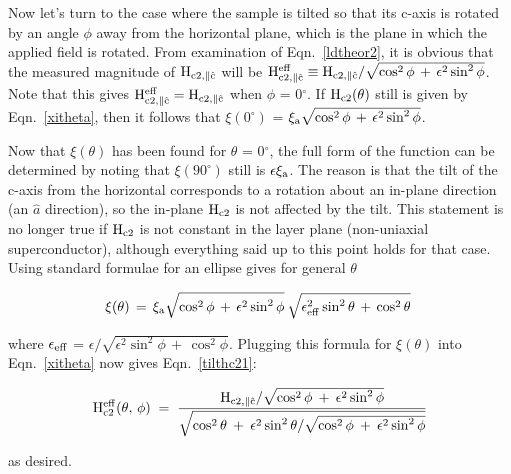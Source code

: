         Now let's turn to the case  where the sample is  tilted so that its
c-axis is rotated by an angle $\phi$ away  from the horizontal plane, which is
the plane in which the applied field is rotated.  From examination of
Eqn.~\ref{ldtheor2}, it is obvious that the measured magnitude of $\rm
H_{c2, \parallel \hat{c}}$ will be $\rm H_{c2, \parallel \hat{c}} ^{eff}
\equiv H_{c2,\parallel \hat{c}}/ \sqrt{\cos^2 \phi \, + \, \epsilon ^2
\sin^2 \phi}$.  Note that this gives $\rm H_{c2, \parallel \hat{c}}^{eff} =
H_{c2,   \parallel  \hat{c}}$ when     $\phi$  =   0$^{\circ}$.   If   $\rm
H_{c2}(\theta)$ still is given by Eqn.~\ref{xitheta}, then it  follows that
$\xi(0^{\circ})$ = $\rm \xi_a \sqrt{\cos^2 \phi \, + \, \epsilon^2 \sin^2
\phi}$.   

        Now that $\xi(\theta)$ has been  found  for $\theta$ = 0$^{\circ}$,
the   full form  of   the function   can  be   determined   by  noting that
$\xi(90^{\circ})$ still is  $\rm \epsilon  \xi_a$.  The reason is  that the
tilt of the c-axis from  the horizontal  corresponds to a rotation about an
in-plane direction (an $\hat{a}$  direction), so the  in-plane $\rm H_{c2}$
is not affected by   the  tilt. This statement is   no longer true  if $\rm
H_{c2}$ is not constant in  the layer plane  (non-uniaxial superconductor),
although  everything  said  up  to this   point holds for  that case. Using
standard formulae for an ellipse gives for general $\theta$

\[
\rm  \xi(\theta) \, = \,  \xi_a
\sqrt{\cos^2 \phi \, + \,   \epsilon^2 \sin^2  \phi} \:  \sqrt{\epsilon_{eff}^2 \sin^2\theta \, +  \,
\cos^2 \theta} \;   
\]

\noindent where $\rm \epsilon_{eff}$ = $\epsilon / \sqrt{\epsilon^2 \sin^2
\phi \, + \, \cos ^2 \phi}$.  Plugging this formula for $\xi(\theta)$ into
Eqn.~\ref{xitheta} now gives Eqn.~\ref{tilthc21}:

\begin{equation}
\label{tilthc21}
\rm H_{c2}^{eff}(\theta,\, \phi) \; = \; \frac{H_{c2, \parallel
\hat{c}}/\sqrt{\cos^2\phi \: + \: \epsilon^2\sin^2\phi}}{\sqrt{\cos^2\theta
\: + \: \epsilon^2\sin^2\theta / \sqrt{\cos^2\phi \: + \: \epsilon^2\sin^2\phi}}} 
\end{equation}

\noindent as desired.   
